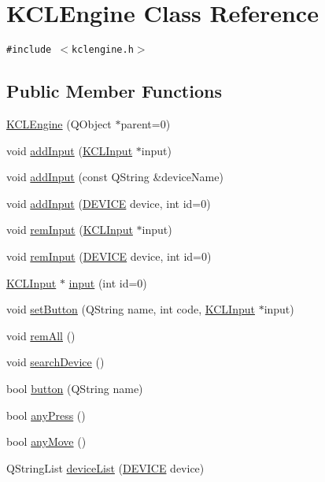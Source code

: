 \hypertarget{class_k_c_l_engine}{
\section{KCLEngine Class Reference}
\label{class_k_c_l_engine}
}
{\tt \#include $<$kclengine.h$>$}

\subsection*{Public Member Functions}
\begin{CompactItemize}
\item 
\hyperlink{class_k_c_l_engine_fbe8d629ee92a2611f9971ed1bb718f3}{KCLEngine} (QObject $\ast$parent=0)
\item 
void \hyperlink{class_k_c_l_engine_20f234eb6e418964d9d2d8e1b9332f4f}{addInput} (\hyperlink{class_k_c_l_input}{KCLInput} $\ast$input)
\item 
void \hyperlink{class_k_c_l_engine_f72512ac8f67ae93805301da15146b8d}{addInput} (const QString \&deviceName)
\item 
void \hyperlink{class_k_c_l_engine_ef5bcdd289dcc543c61205707a1f39f1}{addInput} (\hyperlink{kclinput_8h_833b28f90e109607cd5d9e826474893a}{DEVICE} device, int id=0)
\item 
void \hyperlink{class_k_c_l_engine_f5f9dc8d3add7c53c27a9e5bbad7fef3}{remInput} (\hyperlink{class_k_c_l_input}{KCLInput} $\ast$input)
\item 
void \hyperlink{class_k_c_l_engine_5f138c0986344f0c8bec3f9374e2d122}{remInput} (\hyperlink{kclinput_8h_833b28f90e109607cd5d9e826474893a}{DEVICE} device, int id=0)
\item 
\hyperlink{class_k_c_l_input}{KCLInput} $\ast$ \hyperlink{class_k_c_l_engine_7e4af493818ecd2095325fe28d8db227}{input} (int id=0)
\item 
void \hyperlink{class_k_c_l_engine_886715d09ab70063e43ed63022c04345}{setButton} (QString name, int code, \hyperlink{class_k_c_l_input}{KCLInput} $\ast$input)
\item 
void \hyperlink{class_k_c_l_engine_265a2d0e58a5cd9c872c125bd95a47cb}{remAll} ()
\item 
void \hyperlink{class_k_c_l_engine_2d77246e1d5c194dd224e2f0e7bff05e}{searchDevice} ()
\item 
bool \hyperlink{class_k_c_l_engine_0bcbf5200cdbf84b6e73b804e5064836}{button} (QString name)
\item 
bool \hyperlink{class_k_c_l_engine_aff35dae398c148743797b774d14647a}{anyPress} ()
\item 
bool \hyperlink{class_k_c_l_engine_1dd1ac1227dc51b3244205cf40ab105a}{anyMove} ()
\item 
QStringList \hyperlink{class_k_c_l_engine_7b3834bd74520513874137bb785c027f}{deviceList} (\hyperlink{kclinput_8h_833b28f90e109607cd5d9e826474893a}{DEVICE} device)
\end{CompactItemize}


